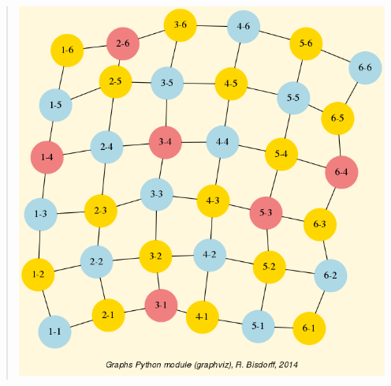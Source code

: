 \documentclass[letterpaper,10pt,english]{sphinxmanual}
\begin{document}
\begin{fulllineitems}
\begin{quote}
\begin{description}
\end{description}

{\hfill\includegraphics{grid-6-6-qcoloring.png}\hfill}
\end{quote}

\begin{fulllineitems}
\label{techDoc:graphs.Q_Coloring.checkFeasibility}
\end{fulllineitems}



\end{fulllineitems}
\end{document}

